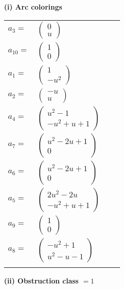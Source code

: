 \documentclass[1p]{elsarticle_modified}
\theoremstyle{definition}
\begin{document}
\flushleft \textbf{(i) Arc colorings}\\
\begin{tabular}{m{7pt} m{180pt} m{7pt} m{180pt} }
\flushright $a_{3}=$&$\begin{pmatrix}0\\u\end{pmatrix}$ \\
\flushright $a_{10}=$&$\begin{pmatrix}1\\0\end{pmatrix}$ \\
\flushright $a_{1}=$&$\begin{pmatrix}1\\- u^2\end{pmatrix}$ \\
\flushright $a_{2}=$&$\begin{pmatrix}- u\\u\end{pmatrix}$ \\
\flushright $a_{4}=$&$\begin{pmatrix}u^2-1\\- u^2+u+1\end{pmatrix}$ \\
\flushright $a_{7}=$&$\begin{pmatrix}u^2-2 u+1\\0\end{pmatrix}$ \\
\flushright $a_{6}=$&$\begin{pmatrix}u^2-2 u+1\\0\end{pmatrix}$ \\
\flushright $a_{5}=$&$\begin{pmatrix}2 u^2-2 u\\- u^2+u+1\end{pmatrix}$ \\
\flushright $a_{9}=$&$\begin{pmatrix}1\\0\end{pmatrix}$ \\
\flushright $a_{8}=$&$\begin{pmatrix}- u^2+1\\u^2- u-1\end{pmatrix}$\\&\end{tabular}
\flushleft \textbf{(ii) Obstruction class $= 1$}\\~\\
\end{document}
